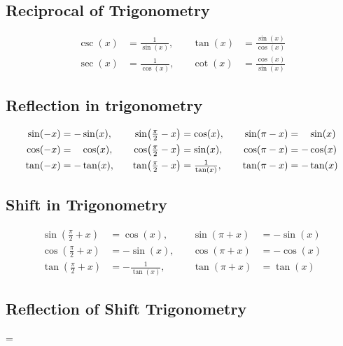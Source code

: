 \documentclass{article}
\begin{document}
\subsection*{Reciprocal of Trigonometry}
  \begin{spreadlines}{1.5ex}
    \begin{alignat*}{2}
      \csc(x) & = \tfrac 1 {\sin(x)}, \quad & \tan(x) & = \tfrac {\sin(x)} {\cos(x)} \\
      \sec(x) & = \tfrac 1 {\cos(x)}, \quad & \cot(x) & = \tfrac {\cos(x)} {\sin(x)}
    \end{alignat*}
  \end{spreadlines}
\subsection*{Reflection in trigonometry}
  \begin{spreadlines}{1.5ex}
    \begin{alignat*}{3}
      \sin(-x) &= -\sin(x), \quad & \sin(\tfrac\pi2 - x) &= \cos(x), \quad & \sin(\pi - x) &= \hphantom-\sin(x) \\
      \cos(-x) &= \hphantom-\cos(x), \quad & \cos(\tfrac\pi2 - x) &= \sin(x), \quad & \cos(\pi - x) &= -\cos(x) \\
      \tan(-x) &= -\tan(x), \quad & \tan(\tfrac\pi2 - x) &= \tfrac1{\tan(x)}, \quad & \tan(\pi - x) &= -\tan(x)
    \end{alignat*}
  \end{spreadlines}
\subsection*{Shift in Trigonometry}
  \begin{spreadlines}{1.5ex}
    \begin{alignat*}{2}
      \sin\left(\frac\pi2 + x\right) &=  \cos(x), \quad & \sin\left(\pi + x\right) &= -\sin(x) \\
      \cos\left(\frac\pi2 + x\right) &= -\sin(x), \quad & \cos\left(\pi + x\right) &= -\cos(x) \\
      \tan\left(\frac\pi2 + x\right) &= -\frac{1}{\tan(x)}, \quad & \tan\left(\pi + x\right) &=  \tan(x)
    \end{alignat*}
  \end{spreadlines}

\subsection*{Reflection of Shift Trigonometry}
  =\hbox{\vrule height3.5ex depth3ex width0pt}
\vspace{1em}
  
\end{document}

